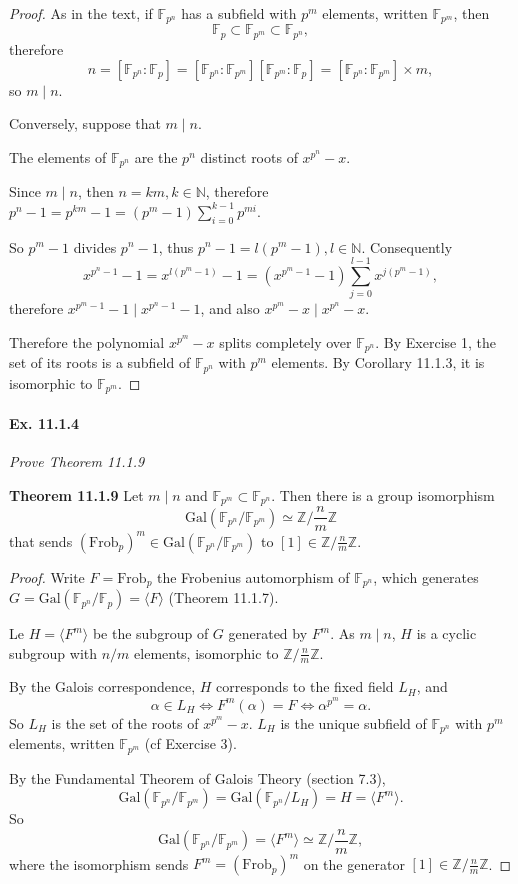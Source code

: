 \documentclass[11pt,a4paper]{article}
\newcommand{\Z}{\mathbb{Z}}
\newcommand{\N}{\mathbb{N}}
\newcommand{\F}{\mathbb{F}}
\newcommand{\Gal}{\mathrm{Gal}}
\begin{document}
\begin{proof} 
As in the text, if $\F_{p^n}$ has a subfield with $p^m$ elements, written $\F_{p^m}$, then
$$\F_p \subset \F_{p^m} \subset \F_{p^n},$$
therefore
$$n = [\F_{p^n} : \F_p] = [\F_{p^n} : \F_{p^m}]  [\F_{p^m} : \F_{p}] =  [\F_{p^n} : \F_{p^m}] \times m,$$
so $m \mid n$.

Conversely, suppose that $m \mid n$.

The elements of $\F_{p^n}$ are the $p^n$ distinct roots of $x^{p^n} - x$.

Since $m\mid n$, then $n = k m, k \in \N$, therefore $p^n - 1 = p^{km} - 1 = (p^m-1)\sum\limits_{i=0}^{k-1} p^{mi}$.

So $p^m-1$ divides $p^n - 1$, thus $p^n-1 = l (p^m-1), l \in \N$. Consequently
$$x^{p^n-1} - 1 = x^{l(p^m-1)}- 1 = (x^{p^m-1} - 1)\sum_{j=0}^{l-1} x^{j(p^m-1)},$$
therefore $ x^{p^m-1} - 1 \mid x^{p^n-1} - 1$, and also $x^{p^m} - x \mid x^{p^n}- x$.

Therefore the polynomial $x^{p^m} -x$ splits completely over $\F_{p^n}$. By Exercise 1, the set of its roots is a subfield of $\F_{p^n}$ with $p^m$ elements. By Corollary 11.1.3, it is isomorphic to $\F_{p^m}$.
\end{proof}

\paragraph{Ex. 11.1.4}

{\it Prove Theorem 11.1.9

\medskip

{\bf Theorem 11.1.9} Let $m\mid n$ and $\F_{p^m} \subset \F_{p^n}$. Then there is a group isomorphism 
$$\Gal(\F_{p^n}/\F_{p^m}) \simeq \Z / {\frac{n}{m}} \Z$$
that sends $(\mathrm{Frob}_p)^m \in \Gal(\F_{p^n}/\F_{p^m})$ to $[1] \in \Z/\frac{n}{m}\Z$.
}

\begin{proof}
Write $F = \mathrm{Frob}_p$ the Frobenius automorphism of $\F_{p^n}$, which generates $G = \Gal(\F_{p^n}/\F_p) = \langle F \rangle$ (Theorem 11.1.7). 

Le $H = \langle F^m \rangle$ be the subgroup of $G$ generated by $F^m$. As $m \mid n$, $H$ is a cyclic subgroup with $n/m$ elements, isomorphic to $\Z/\frac{n}{m}\Z$.

By the Galois correspondence, $H$ corresponds to the fixed field $L_H$, and $$\alpha \in L_H \iff F^m(\alpha) = F \iff \alpha^{p^m} = \alpha.$$ 
So $L_H$ is the set of the roots of $x^{p^m} - x$. $L_H$ is the unique subfield of  $\F_{p^n}$ with $p^m$ elements, written $\F_{p^m}$ (cf Exercise 3).

By the Fundamental Theorem of Galois Theory (section 7.3), 
$$\Gal(\F_{p^n}/\F_{p^m}) = \Gal(\F_{p^n}/L_H) = H = \langle F^m \rangle.$$
So $$\Gal(\F_{p^n}/\F_{p^m}) =\langle F^m \rangle \simeq \Z/\frac{n}{m}\Z,$$
 where the isomorphism sends $F^m = (\mathrm{Frob}_p)^m$ on the generator $[1]\in \Z/\frac{n}{m}\Z$.
\end{proof}
\end{document}
